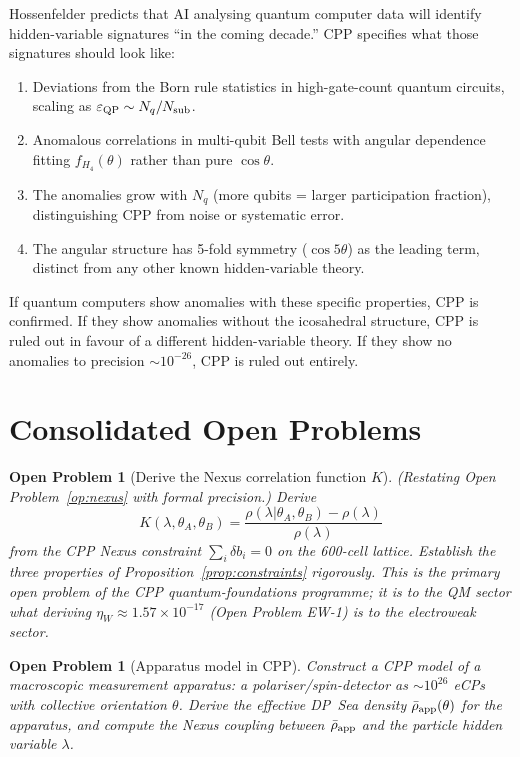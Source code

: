 \documentclass[11pt,a4paper]{article}
\newtheorem{openprob}[theorem]{Open Problem}
\newcommand{\eps}{\varepsilon}
\begin{document}
Hossenfelder predicts that AI analysing quantum computer data will
identify hidden-variable signatures ``in the coming decade.''  CPP
specifies what those signatures should look like:

\begin{enumerate}
\item Deviations from the Born rule statistics in high-gate-count
  quantum circuits, scaling as $\eps_{\rm QP} \sim N_q / N_{\rm sub}$.
\item Anomalous correlations in multi-qubit Bell tests with angular
  dependence fitting $f_{H_4}(\theta)$ rather than pure $\cos\theta$.
\item The anomalies grow with $N_q$ (more qubits = larger participation
  fraction), distinguishing CPP from noise or systematic error.
\item The angular structure has 5-fold symmetry ($\cos 5\theta$) as
  the leading term, distinct from any other known hidden-variable theory.
\end{enumerate}

If quantum computers show anomalies with these specific properties,
CPP is confirmed.  If they show anomalies without the icosahedral
structure, CPP is ruled out in favour of a different hidden-variable
theory.  If they show no anomalies to precision $\sim 10^{-26}$, CPP
is ruled out entirely.

\section{Consolidated Open Problems}

\begin{openprob}[Derive the Nexus correlation function $K$]
\label{op:K}
(Restating Open Problem~\ref{op:nexus} with formal precision.)
Derive
\[
K(\lambda, \theta_A, \theta_B) = \frac{\rho(\lambda|\theta_A,\theta_B)
- \rho(\lambda)}{\rho(\lambda)}
\]
from the CPP Nexus constraint $\sum_i \delta b_i = 0$ on the
600-cell lattice.  Establish the three properties of
Proposition~\ref{prop:constraints} rigorously.
This is the primary open problem of the CPP quantum-foundations
programme; it is to the QM sector what deriving
$\eta_W \approx 1.57\times10^{-17}$ (Open Problem EW-1) is to the
electroweak sector.
\end{openprob}

\begin{openprob}[Apparatus model in CPP]
\label{op:apparatus}
Construct a CPP model of a macroscopic measurement apparatus:
a polariser/spin-detector as $\sim10^{26}$ eCPs with collective
orientation $\theta$.  Derive the effective DP~Sea density
$\bar\rho_{\rm app}(\theta)$ for the apparatus, and compute
the Nexus coupling between $\bar\rho_{\rm app}$ and the
particle hidden variable $\lambda$.
\end{openprob}
\end{document}
